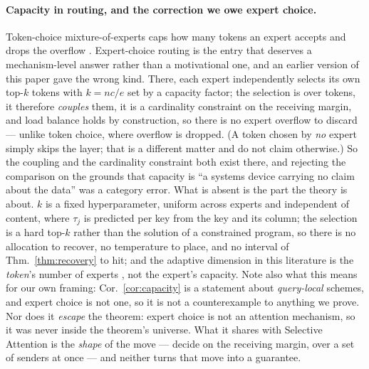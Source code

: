 \documentclass{article}
\begin{document}
\paragraph{Capacity in routing, and the correction we owe expert choice.} Token-choice
mixture-of-experts caps how many tokens an expert accepts and drops the overflow
\citep{lepikhin2021gshard,fedus2022switch}. Expert-choice routing \citep{zhou2022mixture} is the
entry that deserves a mechanism-level answer rather than a motivational one, and an earlier
version of this paper gave the wrong kind. There, each expert independently selects its own
top-$k$ tokens with $k=nc/e$ set by a capacity factor; the selection is over tokens, it therefore
\emph{couples} them, it is a cardinality constraint on the receiving margin, and load balance
holds by construction, so there is no expert overflow to discard --- unlike token choice, where
overflow is dropped. (A token chosen by \emph{no} expert simply skips the layer; that is a
different matter and \citet{zhou2022mixture} do not claim otherwise.) So the coupling and the
cardinality constraint both exist there, and rejecting the comparison on the grounds that
capacity is ``a systems device carrying no claim about the data'' was a category error. What is absent is the part the theory is
about. $k$ is a fixed hyperparameter, uniform across experts and independent of content, where
$\tau_j$ is predicted per key from the key and its column; the selection is a hard top-$k$ rather
than the solution of a constrained program, so there is no allocation to recover, no temperature
to place, and no interval of Thm.~\ref{thm:recovery} to hit; and the adaptive dimension in this
literature is the \emph{token}'s number of experts \citep{yue2024adak}, not the expert's
capacity. Note also what this means for our own framing: Cor.~\ref{cor:capacity} is a statement
about \emph{query-local} schemes, and expert choice is not one, so it is not a counterexample to
anything we prove. Nor does it \emph{escape} the theorem: expert choice is not an attention
mechanism, so it was never inside the theorem's universe. What it shares with Selective Attention
is the \emph{shape} of the move --- decide on the receiving margin, over a set of senders at
once --- and neither turns that move into a guarantee.
\end{document}
